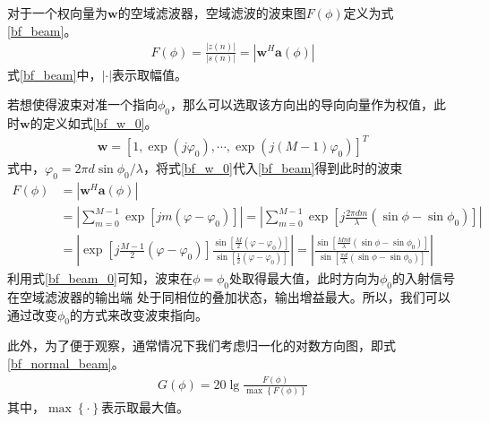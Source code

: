 \documentclass[master]{thesis-uestc}
\begin{document}
对于一个权向量为$\bm{w}$的空域滤波器，空域滤波的波束图$F(\phi)$定义为式\eqref{bf_beam}。
\begin{equation}\label{bf_beam}
    \begin{aligned}
        F(\phi) = \frac{\left|z(n)\right|}{\left|s(n)\right|} = \left|\bm{w}^H\bm{a}(\phi)\right|
    \end{aligned}
\end{equation}
式\eqref{bf_beam}中，$\left|\cdot\right|$表示取幅值。

若想使得波束对准一个指向$\phi_0$，那么可以选取该方向出的导向向量作为权值，此时$\bm{w}$的定义如式\eqref{bf_w_0}。
\begin{equation}\label{bf_w_0}
    \begin{aligned}
        \bm{w} = \left[1,\exp\left(j\varphi_0\right),\cdots,\exp\left(j(M-1)\varphi_0\right)\right]^T
    \end{aligned}
\end{equation}
式中，$\varphi_0=2\pi d\sin\phi_0/\lambda$，将式\eqref{bf_w_0}代入\eqref{bf_beam}得到此时的波束
\begin{equation}\label{bf_beam_0}
    \begin{aligned}
        F(\phi) &= \left|\bm{w}^H\bm{a}(\phi)\right| \\
        &= \left|\sum_{m=0}^{M-1}\exp\left[jm(\varphi - \varphi_0)\right]\right|
        = \left|\sum_{m=0}^{M-1}\exp\left[j\frac{2\pi dm}{\lambda}(\sin\phi-\sin\phi_0)\right]\right| \\
        &= 
        \left|
            \exp\left[j\frac{M-1}{2}(\varphi - \varphi_0)\right]
            \frac{\sin\left[\frac{M}{2}(\varphi - \varphi_0)\right]}
                {\sin\left[\frac{1}{2}(\varphi - \varphi_0)\right]}
        \right| = 
        \left|
            \frac{\sin\left[\frac{M\pi d}{\lambda}(\sin\phi - \sin\phi_0)\right]}
                {\sin\left[\frac{\pi d}{\lambda}(\sin\phi - \sin\phi_0)\right]}
        \right|
    \end{aligned}
\end{equation}
利用式\eqref{bf_beam_0}可知，波束在$\phi=\phi_0$处取得最大值，此时方向为$\phi_0$的入射信号在空域滤波器的输出端
处于同相位的叠加状态，输出增益最大。所以，我们可以通过改变$\phi_0$的方式来改变波束指向。

此外，为了便于观察，通常情况下我们考虑归一化的对数方向图，即式\eqref{bf_normal_beam}。
\begin{equation}\label{bf_normal_beam}
    \begin{aligned}
        G(\phi) = 20\lg\frac{F(\phi)}{\max\left\{F(\phi)\right\}}
    \end{aligned}
\end{equation}
其中，$\max\left\{\cdot\right\}$表示取最大值。
\end{document}
